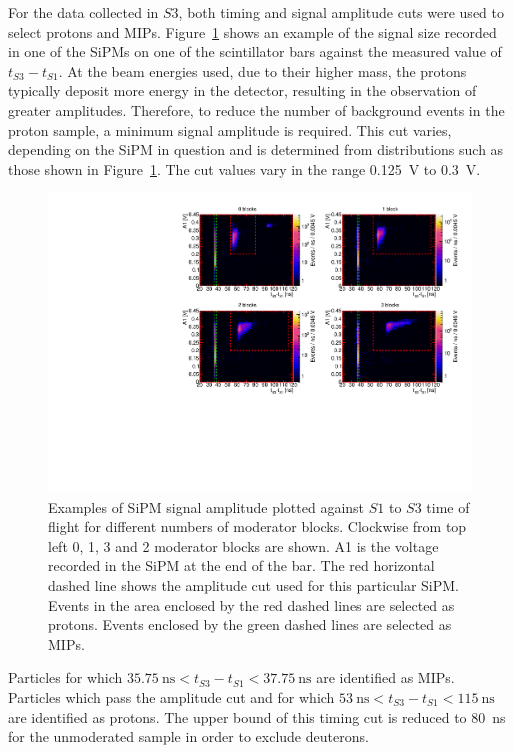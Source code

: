 For the data collected in $\mathit{S3}$, both timing and signal amplitude cuts were used to select protons and MIPs.
Figure~\ref{fig:TvsA} shows an example of the signal size recorded in one of the SiPMs on one of the scintillator bars against the measured value of $t_{\mathit{S3}} - t_{\mathit{S1}}$.
At the beam energies used, due to their higher mass, the protons typically deposit more energy in the detector, resulting in the observation of greater amplitudes.
Therefore, to reduce the number of background events in the proton sample, a minimum signal amplitude is required.
This cut varies, depending on the SiPM in question and is determined from distributions such as those shown in Figure~\ref{fig:TvsA}. 
The cut values vary in the range 0.125~V to 0.3~V.

\begin{figure}[h]
  \centering
  \includegraphics[width=.9\linewidth]{files/Figures/tvsa.pdf}
  \caption{Examples of SiPM signal amplitude plotted against $\mathit{S1}$ to $\mathit{S3}$ time of flight for different numbers of moderator blocks. Clockwise from top left 0, 1, 3 and 2 moderator blocks are shown. A1 is the voltage recorded in the SiPM at the end of the bar. The red horizontal dashed line shows the amplitude cut used for this particular SiPM. Events in the area enclosed by the red dashed lines are selected as protons. Events enclosed by the green dashed lines are selected as MIPs.}
  \label{fig:TvsA}
\end{figure}

Particles for which $35.75~\text{ns}<t_{\mathit{S3}}-t_{\mathit{S1}}<37.75~\text{ns}$ are identified as MIPs.
Particles which pass the amplitude cut and for which $53~\text{ns}<t_{\mathit{S3}}-t_{\mathit{S1}}<115~\text{ns}$ are identified as protons.
The upper bound of this timing cut is reduced to 80~ns for the unmoderated sample in order to exclude deuterons.

